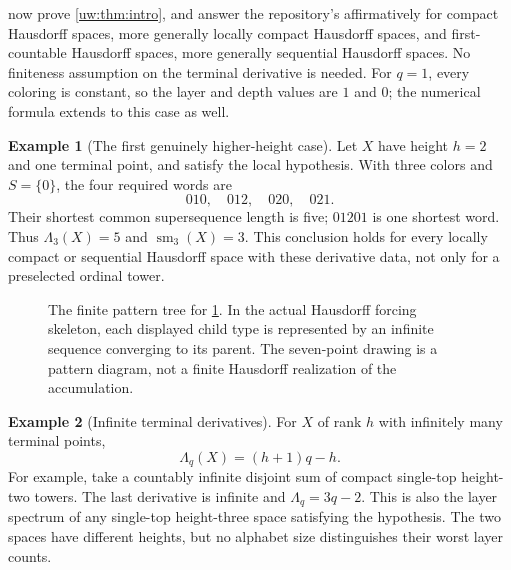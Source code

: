 \documentclass[11pt,letterpaper]{article}
\numberwithin{equation}{section}
\theoremstyle{definition}
\newtheorem{example}[example]{Example}
\theoremstyle{remark}
\theoremstyle{definition}
\begin{document}
 now prove \cref{uw:thm:intro}, and answer the
repository's  affirmatively for compact Hausdorff spaces,
more generally locally compact Hausdorff spaces, and first-countable
Hausdorff spaces, more generally sequential Hausdorff spaces. No finiteness
assumption on the terminal derivative is needed. For $q=1$, every coloring
is constant, so the layer and depth values are $1$ and $0$; the numerical
formula extends to this case as well.

\begin{example}[The first genuinely higher-height case]\label{uw:ex:height2}
Let $X$ have height $h=2$ and one terminal point, and satisfy the local
hypothesis. With three colors and $S=\{0\}$, the four required words are
\[
 010,\quad012,\quad020,\quad021.
\]
Their shortest common supersequence length is five; $01201$ is one shortest
word. Thus $\Lambda_3(X)=5$ and $\operatorname{sm}_3(X)=3$.
This conclusion holds for every locally compact or sequential Hausdorff
space with these derivative data, not only for a preselected ordinal tower.
\end{example}

\begin{figure}[ht]
\centering
{}
\caption{The finite pattern tree for \cref{uw:ex:height2}. In the actual
Hausdorff forcing skeleton, each displayed child type is represented by an
infinite sequence converging to its parent. The seven-point drawing is a
pattern diagram, not a finite Hausdorff realization of the accumulation.}
\label{uw:fig:tree}
\end{figure}

\begin{example}[Infinite terminal derivatives]
For $X$ of rank $h$ with infinitely many terminal points,
\[
 \Lambda_q(X)=(h+1)q-h.
\]
For example, take a countably infinite disjoint sum of compact single-top
height-two towers. The last derivative is infinite and
$\Lambda_q=3q-2$. This is also the layer spectrum of any single-top
height-three space satisfying the hypothesis. The two spaces have different
heights, but no alphabet size distinguishes their worst layer counts.
\end{example}
\end{document}
